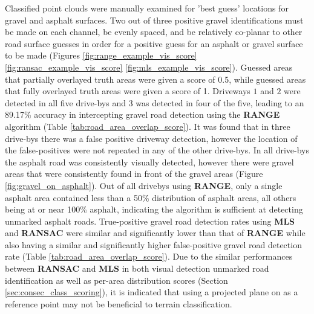 \documentclass[numbered,pdftex]{ohio-etd}
\begin{document}
{{		{Classified point clouds were manually examined for 'best guess' locations for gravel and asphalt surfaces. Two out of three positive gravel identifications must be made on each channel, be evenly spaced, and be relatively co-planar to other road surface guesses in order for a positive guess for an asphalt or gravel surface to be made (Figures \ref{fig:range_example_vis_score} \ref{fig:ransac_example_vis_score} \ref{fig:mls_example_vis_score}). Guessed areas that partially overlayed truth areas were given a score of 0.5, while guessed areas that fully overlayed truth areas were given a score of 1. Driveways $1$ and $2$ were detected in all five drive-bys and $3$ was detected in four of the five, leading to an 89.17\% accuracy in intercepting gravel road detection using the \textbf{RANGE} algorithm (Table \ref{tab:road_area_overlap_score}). It was found that in three drive-bys there was a false positive driveway detection, however the location of the false-positives were not repeated in any of the other drive-bys. In all drive-bys the asphalt road was consistently visually detected, however there were gravel areas that were consistently found in front of the gravel areas (Figure \ref{fig:gravel_on_asphalt}). Out of all drivebys using \textbf{RANGE}, only a single asphalt area contained less than a 50\% distribution of asphalt areas, all others being at or near 100\% asphalt, indicating the algorithm is sufficient at detecting unmarked asphalt roads. True-positive gravel road detection rates using \textbf{MLS} and \textbf{RANSAC} were similar and significantly lower than that of \textbf{RANGE} while also having a similar and significantly higher false-positive gravel road detection rate (Table \ref{tab:road_area_overlap_score}). Due to the similar performances between \textbf{RANSAC} and \textbf{MLS} in both visual detection unmarked road identification as well as per-area distribution scores (Section \ref{sec:consec_class_scoring}), it is indicated that using a projected plane on as a reference point may not be beneficial to terrain classification.}
		
}}
\end{document}
